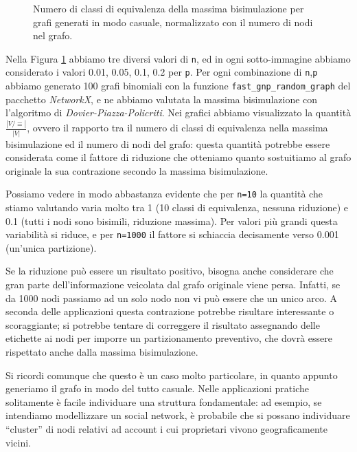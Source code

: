 \begin{figure}[b!]
    \caption{Numero di classi di equivalenza della massima bisimulazione per grafi generati in modo casuale, normalizzato con il numero di nodi nel grafo.}
    \label{fig:bisi_size}
\end{figure}

Nella Figura \ref{fig:bisi_size} abbiamo tre diversi valori di \verb|n|, ed in ogni sotto-immagine abbiamo considerato i valori 0.01, 0.05, 0.1, 0.2 per \verb|p|. Per ogni combinazione di \verb|n|,\verb|p| abbiamo generato 100 grafi binomiali con la funzione \verb|fast_gnp_random_graph| del pacchetto \emph{NetworkX}, e ne abbiamo valutata la massima bisimulazione con l'algoritmo di \emph{Dovier-Piazza-Policriti}. Nei grafici abbiamo visualizzato la quantità $\frac{|V / \equiv|}{|V|}$, ovvero il rapporto tra il numero di classi di equivalenza nella massima bisimulazione ed il numero di nodi del grafo: questa quantità potrebbe essere considerata come il fattore di riduzione che otteniamo quanto sostuitiamo al grafo originale la sua contrazione secondo la massima bisimulazione.

Possiamo vedere in modo abbastanza evidente che per \verb|n=10| la quantità che stiamo valutando varia molto tra 1 (10 classi di equivalenza, nessuna riduzione) e 0.1 (tutti i nodi sono bisimili, riduzione massima). Per valori più grandi questa variabilità si riduce, e per \verb|n=1000| il fattore si schiaccia decisamente verso 0.001 (un'unica partizione).

Se la riduzione può essere un risultato positivo, bisogna anche considerare che gran parte dell'informazione veicolata dal grafo originale viene persa. Infatti, se da 1000 nodi passiamo ad un solo nodo non vi può essere che un unico arco. A seconda delle applicazioni questa contrazione potrebbe risultare interessante o scoraggiante; si potrebbe tentare di correggere il risultato assegnando delle etichette ai nodi per imporre un partizionamento preventivo, che dovrà essere rispettato anche dalla massima bisimulazione.

Si ricordi comunque che questo è un caso molto particolare, in quanto appunto generiamo il grafo in modo del tutto casuale. Nelle applicazioni pratiche solitamente è facile individuare una struttura fondamentale: ad esempio, se intendiamo modellizzare un social network, è probabile che si possano individuare ``cluster'' di nodi relativi ad account i cui proprietari vivono geograficamente vicini.
